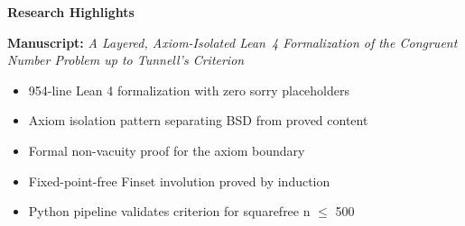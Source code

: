 \documentclass[11pt,a4paper]{article}
\begin{document}
\thispagestyle{empty}

\begin{center}
{\large\bfseries Research Highlights}
\end{center}

\bigskip

\noindent
\textbf{Manuscript:} \emph{A Layered, Axiom-Isolated Lean~4
Formalization of the Congruent Number Problem up to Tunnell's
Criterion}

\bigskip

\begin{itemize}
  \item 954-line Lean 4 formalization with zero sorry placeholders
  \item Axiom isolation pattern separating BSD from proved content
  \item Formal non-vacuity proof for the axiom boundary
  \item Fixed-point-free Finset involution proved by induction
  \item Python pipeline validates criterion for squarefree n $\le$ 500
\end{itemize}
\end{document}
